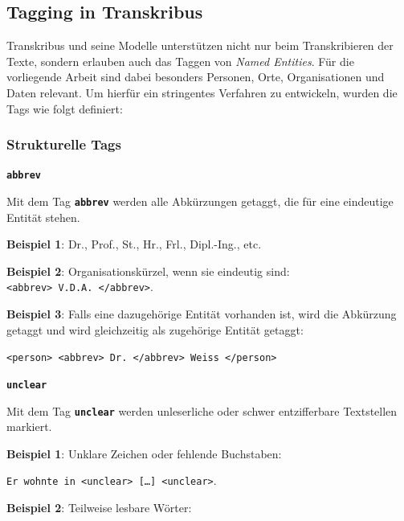 \documentclass[12pt, a4paper, ngerman, bidi=default]{article}
\newcommand{\code}[1]{\colorbox{VeryLightGray}{\texttt{#1}}} %
\begin{document}
\subsection{Tagging in Transkribus}\label{subsec:Taggingregeln_Anhang}


    Transkribus und seine Modelle unterstützen nicht nur beim Transkribieren der Texte, sondern erlauben auch das Taggen von \textit{Named Entities}.  
    Für die vorliegende Arbeit sind dabei besonders Personen, Orte, Organisationen und Daten relevant.  
    Um hierfür ein stringentes Verfahren zu entwickeln, wurden die Tags wie folgt definiert:
  
\subsubsection{Strukturelle Tags}
    \begin{description}

    \item\texttt{\textbf{{\colorbox{abbrev}{abbrev}}}}
    
        
    Mit dem Tag \texttt{\texttt{\textbf{{\colorbox{abbrev}{abbrev}}}}} werden alle Abkürzungen getaggt, die für eine eindeutige Entität stehen.

    
    \noindent\textbf{ Beispiel 1}: Dr., Prof., St., Hr., Frl., Dipl.-Ing., etc.

    \textbf{ Beispiel 2}: Organisationskürzel, wenn sie eindeutig sind:\\\code{<abbrev>~V.D.A.~</abbrev>}.

    \textbf{\textbf{ Beispiel 3}}: Falls eine dazugehörige Entität vorhanden ist, wird die Abkürzung getaggt und wird gleichzeitig als zugehörige Entität getaggt:

    \code{<person>~<abbrev>~Dr.~</abbrev>~Weiss~</person>}
    
    \item\texttt{\textbf{{\colorbox{unclear}{unclear}}}}
    

    Mit dem Tag \texttt{\texttt{\textbf{{\colorbox{unclear}{unclear}}}}} werden unleserliche oder schwer entzifferbare Textstellen markiert.
    
    \noindent\textbf{ Beispiel 1}: Unklare Zeichen oder fehlende Buchstaben: 

    \code{Er wohnte in~<unclear>~[\ldots]~<unclear>}.

    \textbf{ Beispiel 2}: Teilweise lesbare Wörter:


\end{description}
\end{document}
